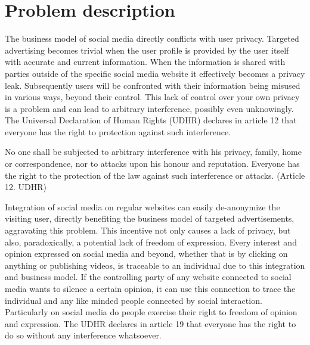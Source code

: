\chapter{Problem description}




The business model of social media directly conflicts with user privacy.
Targeted advertising becomes trivial when the user profile is provided by the user itself with accurate and current information.
When the information is shared with parties outside of the specific social media website it effectively becomes a privacy leak.
Subsequently users will be confronted with their information being misused in various ways, beyond their control.
This lack of control over your own privacy is a problem and can lead to arbitrary interference, possibly even unknowingly.
The Universal Declaration of Human Rights (UDHR) declares in article 12 that everyone has the right to protection against such interference.

\begin{displayquote}
No one shall be subjected to arbitrary interference with his privacy, family, home or correspondence, nor to attacks upon his honour and reputation. Everyone has the right to the protection of the law against such interference or attacks.
(Article 12. UDHR)
\end{displayquote}

Integration of social media on regular websites can easily de-anonymize the visiting user, directly benefiting the business model of targeted advertisements, aggravating this problem.
This incentive not only causes a lack of privacy, but also, paradoxically, a potential lack of freedom of expression.
Every interest and opinion expressed on social media and beyond, whether that is by clicking on anything or publishing videos, is traceable to an individual due to this integration and business model.
If the controlling party of any website connected to social media wants to silence a certain opinion, it can use this connection to trace the individual and any like minded people connected by social interaction.
Particularly on social media do people exercise their right to freedom of opinion and expression.
The UDHR declares in article 19 that everyone has the right to do so without any interference whatsoever.

